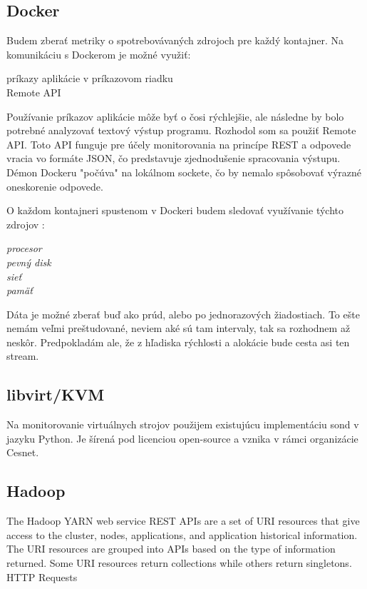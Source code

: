 \documentclass[11pt,final,oneside]{fithesis}
\begin{document}
\subsection{Docker}
Budem zberať metriky o spotrebovávaných zdrojoch pre každý kontajner. Na komunikáciu s Dockerom je možné využiť:
\begin{description}
\item[príkazy aplikácie v príkazovom riadku]
\item[Remote API]
\end{description}

Používanie príkazov aplikácie môže byť o čosi rýchlejšie, ale následne by bolo potrebné analyzovať textový výstup programu.
Rozhodol som sa použiť Remote API. Toto API funguje pre účely monitorovania na princípe REST a odpovede vracia vo formáte JSON, čo predstavuje zjednodušenie spracovania výstupu. Démon Dockeru "počúva" na 
lokálnom sockete, čo by nemalo spôsobovať výrazné oneskorenie odpovede.

O každom kontajneri spustenom v Dockeri budem sledovať využívanie týchto zdrojov :
\begin{description}
\item[\emph{procesor}]
\item[\emph{pevný disk}]
\item[\emph{sieť}]
\item[\emph{pamäť}]
\end{description}

  
Dáta je možné zberať buď ako prúd, alebo po jednorazových žiadostiach. To ešte nemám veľmi preštudované, neviem aké sú tam intervaly, tak sa rozhodnem až neskôr.
Predpokladám ale, že z hľadiska rýchlosti a alokácie bude cesta asi ten stream.

\subsection{libvirt/KVM}
Na monitorovanie virtuálnych strojov použijem existujúcu implementáciu sond v jazyku Python. Je šírená pod licenciou open-source a vznika v rámci organizácie Cesnet. 

\subsection{Hadoop}
The Hadoop YARN web service REST APIs are a set of URI resources that give access to the cluster, nodes, applications, and application historical information. 
The URI resources are grouped into APIs based on the type of information returned. Some URI resources return collections while others return singletons.
HTTP Requests
\end{document}
